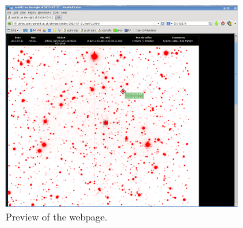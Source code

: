 \begin{figure}[!h]
	\centering
	\includegraphics[width=90mm]{images/website1.png}
	\caption{Preview of the webpage.}
	\label{browser}
\end{figure}

